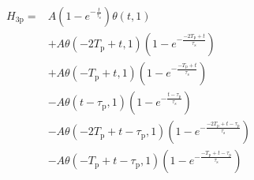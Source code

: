 
\begin{align}
H_{\mathrm{3p}} = & A \left(1 - e^{- \frac{t}{\tau_{\mathrm{s}}}}\right) \theta\left(t, 1\right) \nonumber \\
& + A \theta\left(- 2 T_{\mathrm{p}} + t, 1\right) \left(1 - e^{- \frac{- 2 T_{\mathrm{p}} + t}{\tau_{\mathrm{s}}}}\right) \nonumber \\
& + A \theta\left(- T_{\mathrm{p}} + t, 1\right) \left(1 - e^{- \frac{- T_{\mathrm{p}} + t}{\tau_{\mathrm{s}}}}\right) \nonumber \\
& - A \theta\left(t - \tau_{\mathrm{p}}, 1\right) \left(1 - e^{- \frac{t - \tau_{\mathrm{p}}}{\tau_{\mathrm{s}}}}\right) \nonumber \\
& - A \theta\left(- 2 T_{\mathrm{p}} + t - \tau_{\mathrm{p}}, 1\right) \left(1 - e^{- \frac{- 2 T_{\mathrm{p}} + t - \tau_{\mathrm{p}}}{\tau_{\mathrm{s}}}}\right) \nonumber \\
& - A \theta\left(- T_{\mathrm{p}} + t - \tau_{\mathrm{p}}, 1\right) \left(1 - e^{- \frac{- T_{\mathrm{p}} + t - \tau_{\mathrm{p}}}{\tau_{\mathrm{s}}}}\right) 
\end{align}\,\left[\mathrm{}\right]
